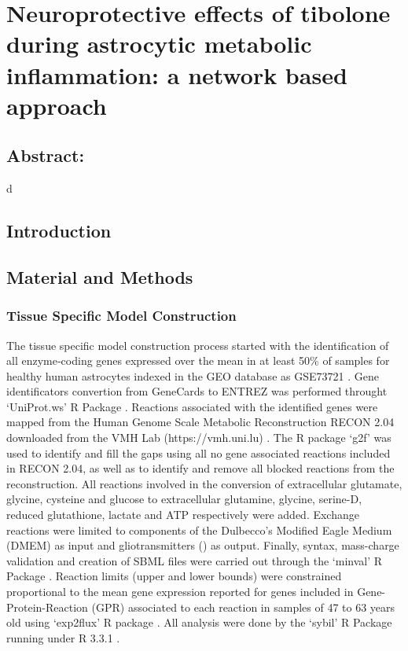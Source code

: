 \chapter{Neuroprotective effects of tibolone during astrocytic metabolic inflammation: a network based approach}
\section*{Abstract:}d
\section{Introduction}
\section{Material and Methods}
\subsection{Tissue Specific Model Construction}
The tissue specific model construction process started with the identification of all enzyme‐coding genes expressed over the mean in at least 50\% of samples for healthy human astrocytes indexed in the GEO database \cite{Edgar2002} as GSE73721 \citep{Zhang2016}. Gene identificators convertion from GeneCards\cite{rebhan1997genecards} to ENTREZ \cite{maglott2005entrez} was performed throught `UniProt.ws' R Package \cite{Carlson2016}. Reactions associated with the identified genes were mapped from the Human Genome Scale  Metabolic Reconstruction RECON 2.04 downloaded from the VMH Lab (https://vmh.uni.lu) \cite{thiele2013community}. The R package `g2f' \cite{G2F} was used to identify and fill the gaps using all no gene associated reactions included in RECON 2.04, as well as to identify and remove all blocked reactions  from the reconstruction. All reactions involved in the conversion of extracellular glutamate, glycine, cysteine and glucose to extracellular glutamine, glycine, serine-D, reduced glutathione, lactate and ATP respectively were added. Exchange reactions were limited to components of the Dulbecco's Modified Eagle Medium (DMEM) as input and gliotransmitters () as output. Finally, syntax, mass-charge validation and creation of SBML files were carried out through the `minval' R Package \cite{MINVAL}. Reaction limits (upper and lower bounds) were constrained proportional to the mean gene expression reported for genes included in Gene-Protein-Reaction (GPR) \cite{Thiele2010} associated to each reaction in samples of 47 to 63 years old using `exp2flux' R package \cite{EXP2FLUX}. All analysis were done by the `sybil' \cite{Gelius-Dietrich2013} R Package running under R 3.3.1 \cite{RCoreTeam2016}.
